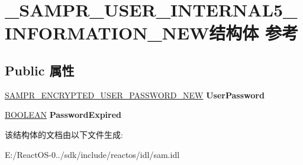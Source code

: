 \hypertarget{struct___s_a_m_p_r___u_s_e_r___i_n_t_e_r_n_a_l5___i_n_f_o_r_m_a_t_i_o_n___n_e_w}{}\section{\+\_\+\+S\+A\+M\+P\+R\+\_\+\+U\+S\+E\+R\+\_\+\+I\+N\+T\+E\+R\+N\+A\+L5\+\_\+\+I\+N\+F\+O\+R\+M\+A\+T\+I\+O\+N\+\_\+\+N\+E\+W结构体 参考}
\label{struct___s_a_m_p_r___u_s_e_r___i_n_t_e_r_n_a_l5___i_n_f_o_r_m_a_t_i_o_n___n_e_w}
\subsection*{Public 属性}
\begin{DoxyCompactItemize}
\item 
\mbox{\label{struct___s_a_m_p_r___u_s_e_r___i_n_t_e_r_n_a_l5___i_n_f_o_r_m_a_t_i_o_n___n_e_w_a476dfef565d09d15d1b0521551ecd08d}} 
\hyperlink{struct___s_a_m_p_r___e_n_c_r_y_p_t_e_d___u_s_e_r___p_a_s_s_w_o_r_d___n_e_w}{S\+A\+M\+P\+R\+\_\+\+E\+N\+C\+R\+Y\+P\+T\+E\+D\+\_\+\+U\+S\+E\+R\+\_\+\+P\+A\+S\+S\+W\+O\+R\+D\+\_\+\+N\+EW} {\bfseries User\+Password}
\item 
\mbox{\label{struct___s_a_m_p_r___u_s_e_r___i_n_t_e_r_n_a_l5___i_n_f_o_r_m_a_t_i_o_n___n_e_w_a30e4bcc21937ef8d9f9da776c63fd675}} 
\hyperlink{_processor_bind_8h_a112e3146cb38b6ee95e64d85842e380a}{B\+O\+O\+L\+E\+AN} {\bfseries Password\+Expired}
\end{DoxyCompactItemize}


该结构体的文档由以下文件生成\+:\begin{DoxyCompactItemize}
\item 
E\+:/\+React\+O\+S-\/0../sdk/include/reactos/idl/sam.\+idl\end{DoxyCompactItemize}
